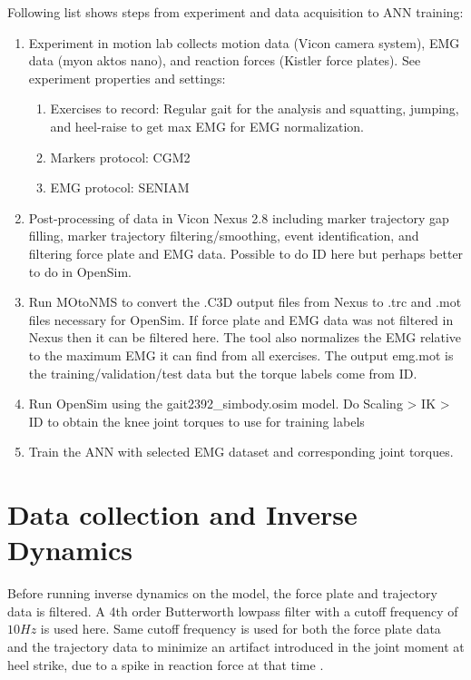 \documentclass[../main.tex]{subfiles}
\begin{document}
Following list shows steps from experiment and data acquisition to ANN training:
\begin{enumerate}
    \item Experiment in motion lab collects motion data (Vicon camera system), EMG data (myon aktos nano), and reaction forces (Kistler force plates). See experiment properties and settings:
    \begin{enumerate}
        \item Exercises to record: Regular gait for the analysis and squatting, jumping, and heel-raise to get max EMG for EMG normalization.
        \item Markers protocol: CGM2
        \item EMG protocol: SENIAM
    \end{enumerate}
    \item Post-processing of data in Vicon Nexus 2.8 including marker trajectory gap filling, marker trajectory filtering/smoothing, event identification, and filtering force plate and EMG data. Possible to do ID here but perhaps better to do in OpenSim.
    \item Run MOtoNMS to convert the .C3D output files from Nexus to .trc and .mot files necessary for OpenSim. If force plate and EMG data was not filtered in Nexus then it can be filtered here. The tool also normalizes the EMG relative to the maximum EMG it can find from all exercises. The output emg.mot is the training/validation/test data but the torque labels come from ID.
    \item Run OpenSim using the gait2392\_simbody.osim model. Do Scaling > IK > ID to obtain the knee joint torques to use for training labels
    \item Train the ANN with selected EMG dataset and corresponding joint torques.
\end{enumerate}



\section{Data collection and Inverse Dynamics}
Before running inverse dynamics on the model, the force plate and trajectory data is filtered. A 4th order Butterworth lowpass filter with a cutoff frequency of $10Hz$ is used here. Same cutoff frequency is used for both the force plate data and the trajectory data to minimize an artifact introduced in the joint moment at heel strike, due to a spike in reaction force at that time \cite{Kristianslund2012}.
\end{document}
